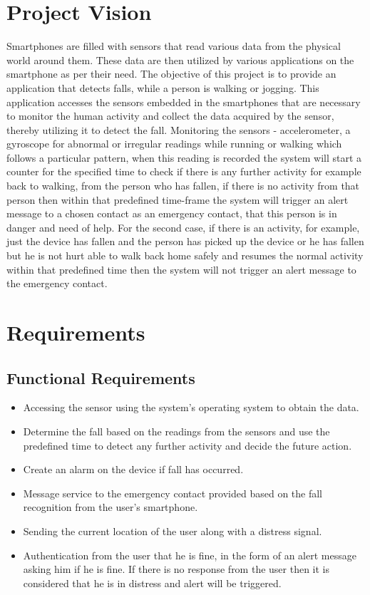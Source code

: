 \documentclass[conference]{IEEEtran}
\begin{document}
\section{Project Vision}
Smartphones are filled with sensors that read various data from the physical world around them. These data are then utilized by various applications on the smartphone as per their need. The objective of this project is to provide an application that detects falls, while a person is walking or jogging.
This application accesses the sensors embedded in the smartphones that are necessary to monitor the human activity and collect the data acquired by the sensor, thereby utilizing it to detect the fall.
Monitoring the sensors - accelerometer, a gyroscope for abnormal or irregular readings while running or walking which follows a particular pattern, when this reading is recorded the system will start a counter for the specified time to check if there is any further activity for example back to walking, from the person who has fallen, if there is no activity from that person then within that predefined time-frame the system will trigger an alert message to a chosen contact as an emergency contact, that this person is in danger and need of help. For the second case, if there is an activity, for example, just the device has fallen and the person has picked up the device or he has fallen but he is not hurt able to walk back home safely and resumes the normal activity within that predefined time then the system will not trigger an alert message to the emergency contact.

\section{Requirements}
\subsection{Functional Requirements}
\begin{itemize}
\item Accessing the sensor using the system's operating system to obtain the data.
\item Determine the fall based on the readings from the sensors and use the predefined time to detect any further activity and decide the future action.
\item Create an alarm on the device if fall has occurred.
\item Message service to the emergency contact provided based on the fall recognition from the user's smartphone.
\item Sending the current location of the user along with a distress signal.
\item Authentication from the user that he is fine, in the form of an alert message asking him if he is fine. If there is no response from the user then it is considered that he is in distress and alert will be triggered.
\end{itemize}
\end{document}
